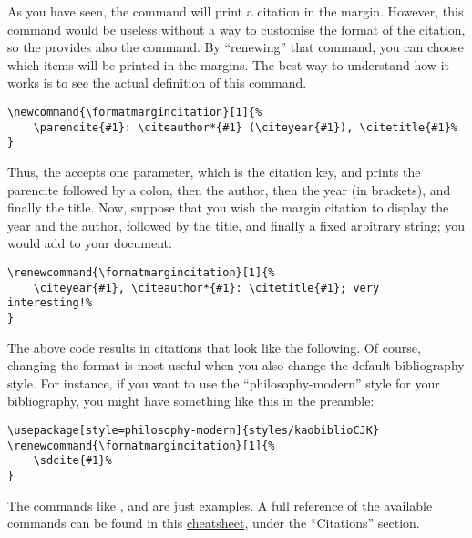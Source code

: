 As you have seen, the  command will print a citation
in the margin. However, this command would be useless without a way to
customise the format of the citation, so the  provides
also the  command. By \enquote{renewing}
that command, you can choose which items will be printed in the margins.
The best way to understand how it works is to see the actual definition
of this command.

\begin{lstlisting}[style=kaolstplain]
\newcommand{\formatmargincitation}[1]{%
	\parencite{#1}: \citeauthor*{#1} (\citeyear{#1}), \citetitle{#1}%
}
\end{lstlisting}

Thus, the  accepts one parameter, which is
the citation key, and prints the parencite followed by a colon, then the
author, then the year (in brackets), and finally the
title. Now, suppose that you wish the margin
citation to display the year and the author, followed by the title, and
finally a fixed arbitrary string; you would add to your document:

\begin{lstlisting}[style=kaolstplain]
\renewcommand{\formatmargincitation}[1]{%
	\citeyear{#1}, \citeauthor*{#1}: \citetitle{#1}; very interesting!%
}
\end{lstlisting}

\renewcommand{\formatmargincitation}[1]{%
	\citeyear{#1}, \citeauthor*{#1}: \citetitle{#1}; very interesting!%
}

The above code results in citations that look like the
following. Of course, changing the format is most
useful when you also change the default bibliography style. For
instance, if you want to use the \enquote{philosophy-modern} style for
your bibliography, you might have something like this in the preamble:

\begin{lstlisting}[style=kaolstplain,linewidth=1.5\textwidth]
\usepackage[style=philosophy-modern]{styles/kaobiblioCJK}
\renewcommand{\formatmargincitation}[1]{%
	\sdcite{#1}%
}

\end{lstlisting}

\renewcommand{\formatmargincitation}[1]{%
	\parencite{#1}: \citeauthor*{#1} (\citeyear{#1}), \citetitle{#1}%
}

The commands like , 
and  are just examples. A full
reference of the available commands can be found in this
\href{http://tug.ctan.org/info/biblatex-cheatsheet/biblatex-cheatsheet.pdf}{cheatsheet},
under the \enquote{Citations} section.

